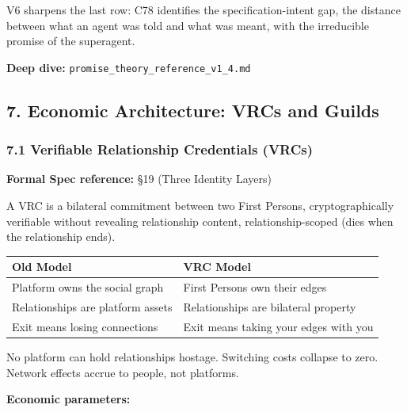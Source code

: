 \documentclass[
]{article}
\newcounter{none} %
\begin{document}
V6 sharpens the last row: C78 identifies the specification-intent gap,
the distance between what an agent was told and what was meant, with the
irreducible promise of the superagent.

\textbf{Deep dive:} \texttt{promise\_theory\_reference\_v1\_4.md}

\subsection{7. Economic Architecture: VRCs and
Guilds}\label{economic-architecture-vrcs-and-guilds}

\subsubsection{7.1 Verifiable Relationship Credentials
(VRCs)}\label{verifiable-relationship-credentials-vrcs}

\textbf{Formal Spec reference:} §19 (Three Identity Layers)

A VRC is a bilateral commitment between two First Persons,
cryptographically verifiable without revealing relationship content,
relationship-scoped (dies when the relationship ends).

{\def\LTcaptype{none} %
\begin{longtable}[]{@{}
  >{\raggedright\arraybackslash}p{}
  >{\raggedright\arraybackslash}p{}@{}}
\toprule\noalign{}
\begin{minipage}[b]{\linewidth}\raggedright
Old Model
\end{minipage} & \begin{minipage}[b]{\linewidth}\raggedright
VRC Model
\end{minipage} \\
\midrule\noalign{}
\endhead
\bottomrule\noalign{}
\endlastfoot
Platform owns the social graph & First Persons own their edges \\
Relationships are platform assets & Relationships are bilateral
property \\
Exit means losing connections & Exit means taking your edges with you \\
\end{longtable}
}

No platform can hold relationships hostage. Switching costs collapse to
zero. Network effects accrue to people, not platforms.

\textbf{Economic parameters:}
\end{document}
